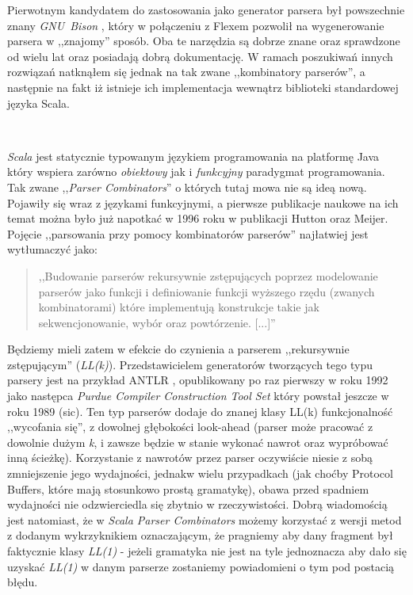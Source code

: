 \documentclass[pdflatex,11pt]{aghdpl}
\begin{document}
Pierwotnym kandydatem do zastosowania jako generator parsera był powszechnie znany \textit{GNU~Bison} \cite{Bison},
który w połączeniu z Flexem pozwolił na wygenerowanie parsera w ,,znajomy'' sposób. Oba te narzędzia są dobrze znane oraz sprawdzone od wielu lat oraz posiadają dobrą dokumentację.
W ramach poszukiwań innych rozwiązań natknąłem się jednak na tak zwane ,,kombinatory parserów'', a następnie na fakt iż istnieje ich implementacja wewnątrz
biblioteki standardowej języka Scala.

~\\\*

\textit{Scala} jest statycznie typowanym językiem programowania na platformę Java który wspiera zarówno \textit{obiektowy} jak i \textit{funkcyjny} paradygmat programowania.
Tak zwane ,,\textit{Parser Combinators}'' o których tutaj mowa nie są ideą nową. Pojawiły się wraz z językami funkcyjnymi, a pierwsze publikacje naukowe
na ich temat można było już napotkać w 1996 roku \cite{monadparsing} w publikacji Hutton oraz Meijer.
Pojęcie ,,parsowania przy pomocy kombinatorów parserów'' najłatwiej jest wytłumaczyć jako:


\begin{quotation}
 ,,Budowanie parserów rekursywnie zstępujących poprzez modelowanie parserów jako funkcji
   i definiowanie funkcji wyższego rzędu (zwanych kombinatorami) które implementują 
   konstrukcje takie jak sekwencjonowanie, wybór oraz powtórzenie. [...]''
   \cite{monadparsing}
\end{quotation}

Będziemy mieli zatem w efekcie do czynienia a parserem ,,rekursywnie zstępującym'' (\textit{LL(k)}). Przedstawicielem generatorów tworzących tego typu parsery jest na przykład
ANTLR \cite{Antlr}, opublikowany po raz pierwszy w roku 1992 jako następca \textit{Purdue Compiler Construction Tool Set} który powstał jeszcze w roku 1989 (sic).
Ten typ parserów dodaje do znanej klasy LL(k) funkcjonalność ,,wycofania się'', z dowolnej głębokości look-ahead (parser może pracować z dowolnie dużym \textit{k},
i zawsze będzie w stanie wykonać nawrot oraz wypróbować inną ścieżkę). Korzystanie z nawrotów przez parser oczywiście niesie z sobą zmniejszenie jego wydajności,
jednakw wielu przypadkach (jak choćby Protocol Buffers, które mają stosunkowo prostą gramatykę), obawa przed spadniem wydajności nie odzwierciedla się zbytnio w 
rzeczywistości. Dobrą wiadomością jest natomiast, że w \textit{Scala Parser Combinators} możemy korzystać z wersji metod z dodanym wykrzyknikiem oznaczającym,
że pragniemy aby dany fragment był faktycznie klasy \textit{LL(1)} - jeżeli gramatyka nie jest na tyle jednoznacza aby dało się uzyskać \textit{LL(1)} w danym parserze
zostaniemy powiadomieni o tym pod postacią błędu.
\end{document}
